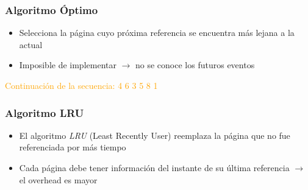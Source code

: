 \begin{frame}
  \frametitle{Algoritmo \textbf{Óptimo}}
  \begin{itemize}
  	\item Selecciona la página cuyo próxima referencia se encuentra más lejana a la actual
	\item Imposible de implementar $\rightarrow$ no se conoce los futuros eventos	  	
  \end{itemize}
  \begin{table}
	  \centering
  \end{table}
  \textcolor{orange}{Continuación de la secuencia: 4 6 3 5 8 1}
\end{frame}

\begin{frame}
  \frametitle{Algoritmo \textbf{LRU}}
  \begin{itemize}
  	\item El algoritmo \emph{LRU} (Least Recently User) reemplaza la página que no fue referenciada por más tiempo
	\item Cada página debe tener información del instante de su última referencia $\rightarrow$ el overhead es mayor
  \end{itemize}
  \begin{table}
	  \centering
  \end{table}
\end{frame}

